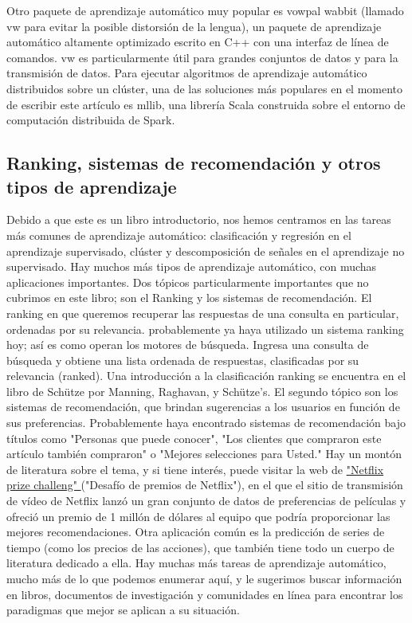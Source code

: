 Otro paquete de aprendizaje automático muy popular es {\ttfamily vowpal wabbit} 
(llamado  {\ttfamily vw } para evitar la posible distorsión de la lengua), un paquete
de aprendizaje automático altamente optimizado escrito en  C{\scriptsize++}   con una interfaz de 
línea de comandos.   {\ttfamily vw} es particularmente útil para grandes conjuntos de datos y
para la transmisión de datos. Para ejecutar algoritmos de aprendizaje automático distribuidos sobre un clúster, una de las soluciones más populares en el momento de escribir este artículo es {\ttfamily mllib}, una librería Scala construida sobre el entorno de computación distribuida de Spark.



\subsection{Ranking, sistemas de recomendación y otros tipos de aprendizaje}
 

Debido a que este es un libro introductorio, nos hemos centramos en las tareas más comunes de aprendizaje automático: clasificación y regresión en el aprendizaje supervisado,  clúster y
descomposición de señales en el aprendizaje no supervisado. Hay muchos más tipos de aprendizaje automático, con muchas aplicaciones importantes.  Dos tópicos  particularmente importantes que no cubrimos en este libro; son  el Ranking  y los sistemas de recomendación. El ranking  en que queremos recuperar las respuestas de una  consulta en particular, ordenadas por su relevancia.  probablemente ya haya utilizado un sistema  ranking hoy; así es como  operan los motores de búsqueda. Ingresa una consulta de búsqueda y obtiene una lista ordenada de respuestas, clasificadas por su relevancia (ranked).   Una  introducción a la   clasificación ranking se encuentra en el   libro de Schütze {} por   Manning, Raghavan, y  Schütze’s.     El segundo tópico son los sistemas de recomendación, que brindan sugerencias a los  usuarios en función de sus preferencias. Probablemente haya encontrado sistemas de recomendación bajo títulos como "{}Personas que puede conocer"{},  "{}Los clientes que compraron este artículo también compraron"{}  o  "{}Mejores selecciones para Usted."{} 
Hay un montón de literatura sobre el tema, y si tiene interés, puede visitar la web de  
\href{http://www.netflixprize.com/}{\textcolor{vino}{ "{}Netflix prize challeng"{} } }
  ("{}Desafío de premios de Netflix"{}),  en el que el sitio de transmisión de vídeo de Netflix lanzó un gran conjunto de datos de preferencias de películas y ofreció un premio de 1 millón de dólares al equipo que podría proporcionar las mejores recomendaciones.
Otra  aplicación común es la predicción de series de tiempo (como los precios de las acciones), que también tiene  todo un cuerpo de literatura dedicado a ella.   
Hay muchas más tareas de aprendizaje automático,  mucho más de lo que podemos enumerar aquí, y le sugerimos  buscar información en libros, documentos de investigación y comunidades en línea para encontrar los paradigmas que mejor se aplican a su situación.
 
